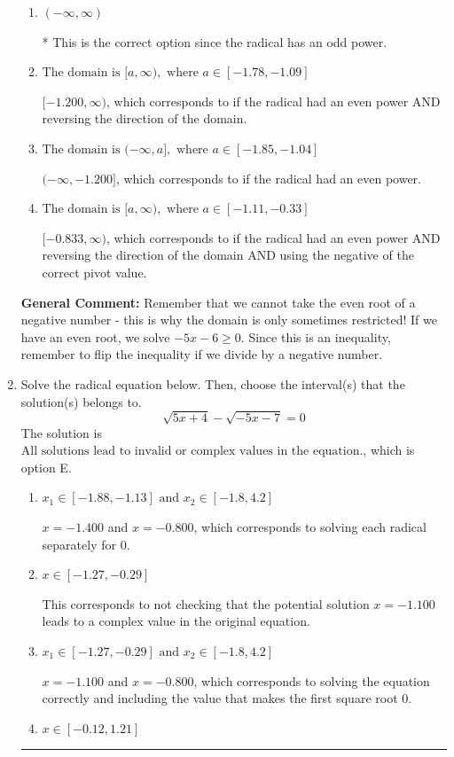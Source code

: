 \documentclass{extbook}[14pt]
\newcommand{\litem}[1]{\item #1

\rule{\textwidth}{0.4pt}}
\begin{document}
\begin{enumerate}
{\begin{enumerate}[label=\Alph*.]
$(-\infty, -0.833]$, which corresponds to if the radical had an even power AND using the negative of the correct pivot value.
\item \( (-\infty, \infty) \)

* This is the correct option since the radical has an odd power.
\item \( \text{The domain is } [a, \infty), \text{   where } a \in [-1.78, -1.09] \)

$[-1.200, \infty)$, which corresponds to if the radical had an even power AND reversing the direction of the domain.
\item \( \text{The domain is } (-\infty, a], \text{   where } a \in [-1.85, -1.04] \)

$(-\infty, -1.200]$, which corresponds to if the radical had an even power.
\item \( \text{The domain is } [a, \infty), \text{   where } a \in [-1.11, -0.33] \)

$[-0.833, \infty)$, which corresponds to if the radical had an even power AND reversing the direction of the domain AND using the negative of the correct pivot value.
\end{enumerate}

\textbf{General Comment:} Remember that we cannot take the even root of a negative number - this is why the domain is only sometimes restricted! If we have an even root, we solve $-5 x - 6 \geq 0$. Since this is an inequality, remember to flip the inequality if we divide by a negative number.
}
\litem{
Solve the radical equation below. Then, choose the interval(s) that the solution(s) belongs to.
\[ \sqrt{5 x + 4} - \sqrt{-5 x - 7} = 0 \]The solution is \( \text{All solutions lead to invalid or complex values in the equation.} \), which is option E.\begin{enumerate}[label=\Alph*.]
\item \( x_1 \in [-1.88, -1.13] \text{ and } x_2 \in [-1.8,4.2] \)

$x = -1.400$ and $x = -0.800$, which corresponds to solving each radical separately for 0.
\item \( x \in [-1.27,-0.29] \)

This corresponds to not checking that the potential solution $x = -1.100$ leads to a complex value in the original equation.
\item \( x_1 \in [-1.27, -0.29] \text{ and } x_2 \in [-1.8,4.2] \)

$x = -1.100$ and $x = -0.800$, which corresponds to solving the equation correctly and including the value that makes the first square root 0.
\item \( x \in [-0.12,1.21] \)


\end{enumerate}}
\end{enumerate}
\end{document}
